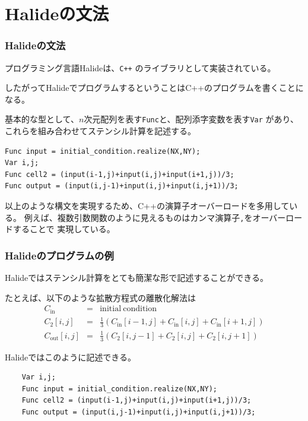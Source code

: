 \documentclass[dvipdfmx,cjk]{beamer}
\begin{document}
\section{Halideの文法} 
\begin{frame}[fragile]\frametitle{Halideの文法}

プログラミング言語Halideは、{\tt C++} のライブラリとして実装されている。

したがってHalideでプログラムするということはC++のプログラムを書くことになる。

基本的な型として、$n$次元配列を表す{\tt Func}と、配列添字変数を表す{\tt Var}
があり、これらを組み合わせてステンシル計算を記述する。

\pause

\begingroup
    \fontsize{8pt}{9pt}\selectfont
\begin{verbatim}
Func input = initial_condition.realize(NX,NY);
Var i,j;
Func cell2 = (input(i-1,j)+input(i,j)+input(i+1,j))/3;
Func output = (input(i,j-1)+input(i,j)+input(i,j+1))/3;
\end{verbatim}
\endgroup

\pause

以上のような構文を実現するため、C++の演算子オーバーロードを多用している。
例えば、複数引数関数のように見えるものはカンマ演算子{\tt ,}をオーバーロードすることで
実現している。

\end{frame}


\begin{frame}[fragile]\frametitle{Halideのプログラムの例}

Halideではステンシル計算をとても簡潔な形で記述することができる。

\pause

たとえば、以下のような拡散方程式の離散化解法は
\begin{eqnarray}
C_\mathrm{in} &=& \mathrm{initial~condition} \\
C_2 [i,j] &=& \frac{1}{3}\left(C_\mathrm{in}[i-1,j] + C_\mathrm{in}[i,j] + C_\mathrm{in}[i+1,j]\right) \\
C_\mathrm{out} [i,j] &=& \frac{1}{3}\left(C_\mathrm{2}[i,j-1] + C_\mathrm{2}[i,j] + C_\mathrm{2}[i,j+1]\right)
\end{eqnarray}

\pause

Halideではこのように記述できる。
\begin{center}
\begingroup
    \fontsize{9pt}{10pt}\selectfont
\begin{verbatim}
    Var i,j;
    Func input = initial_condition.realize(NX,NY);
    Func cell2 = (input(i-1,j)+input(i,j)+input(i+1,j))/3;
    Func output = (input(i,j-1)+input(i,j)+input(i,j+1))/3;
\end{verbatim}
\endgroup
\end{center}

\end{frame}
\end{document}
